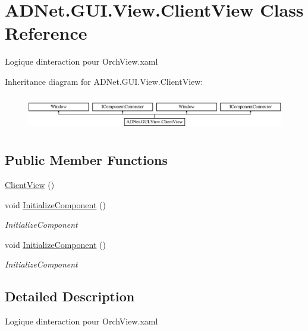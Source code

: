 \hypertarget{class_a_d_net_1_1_g_u_i_1_1_view_1_1_client_view}{}\section{A\+D\+Net.\+G\+U\+I.\+View.\+Client\+View Class Reference}
\label{class_a_d_net_1_1_g_u_i_1_1_view_1_1_client_view}


Logique d\textquotesingle{}interaction pour Orch\+View.\+xaml  


Inheritance diagram for A\+D\+Net.\+G\+U\+I.\+View.\+Client\+View\+:\begin{figure}[H]
\begin{center}
\leavevmode
\includegraphics[height=1.581921cm]{class_a_d_net_1_1_g_u_i_1_1_view_1_1_client_view}
\end{center}
\end{figure}
\subsection*{Public Member Functions}
\begin{DoxyCompactItemize}
\item 
\hyperlink{class_a_d_net_1_1_g_u_i_1_1_view_1_1_client_view_ae5f5566b3fab4be27fd63ed632476505}{Client\+View} ()
\item 
void \hyperlink{class_a_d_net_1_1_g_u_i_1_1_view_1_1_client_view_a7900e15bd1aa06af5875d5257e6b17ac}{Initialize\+Component} ()
\begin{DoxyCompactList}\small\item\em Initialize\+Component \end{DoxyCompactList}\item 
void \hyperlink{class_a_d_net_1_1_g_u_i_1_1_view_1_1_client_view_a7900e15bd1aa06af5875d5257e6b17ac}{Initialize\+Component} ()
\begin{DoxyCompactList}\small\item\em Initialize\+Component \end{DoxyCompactList}\end{DoxyCompactItemize}


\subsection{Detailed Description}
Logique d\textquotesingle{}interaction pour Orch\+View.\+xaml 

